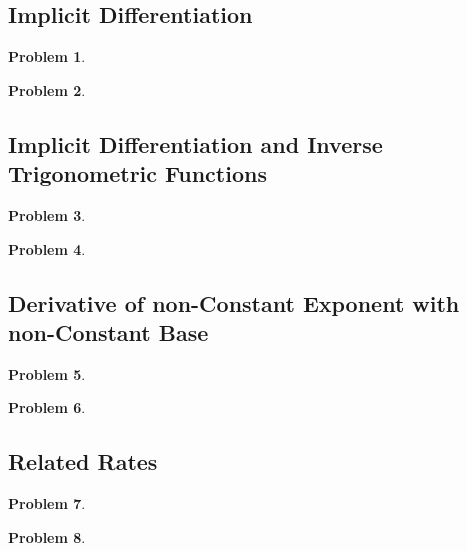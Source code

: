 \documentclass{article}
\newtheorem{problem}{Problem}
\begin{document}
\subsection{Implicit Differentiation}\label{secMPSImplicitDifferentiation}
\begin{problem}

\end{problem}
\begin{problem}

\end{problem}


\subsection{Implicit Differentiation and Inverse Trigonometric Functions}
\begin{problem}

\end{problem}
\begin{problem}

\end{problem}


\subsection{Derivative of non-Constant Exponent with non-Constant Base}\label{secMPSDerivativeNonConstExponent}
\begin{problem}

\end{problem}


\begin{problem}

\end{problem}

\subsection{Related Rates}\label{secMPSrelatedRates}
\begin{problem}

\end{problem}

\begin{problem}

\end{problem}

\end{document}
